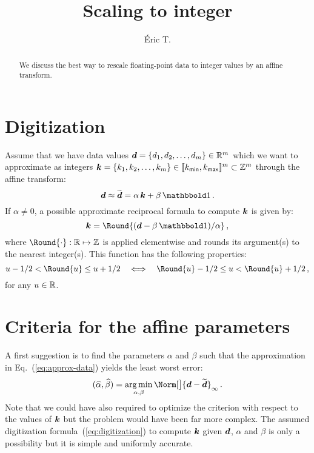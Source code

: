 \documentclass[]{article}
\title{Scaling to integer}
\author{Éric T.}
\newcommand*{\IntRange}[1]{[\![#1]\!]}
\renewcommand*{\proxy}[1]{\widetilde{#1}}
\begin{document}
\maketitle

\begin{abstract}
We discuss the best way to rescale floating-point data to integer values by an
affine transform.
\end{abstract}

\section{Digitization}

Assume that we have data values $\boldsymbol{d} = \{d_1,d_2,\ldots,d_m\} \in \mathbb{R}^m$
which we want to approximate as integers $\V k = \{k_1,k_2,\ldots,k_m\} \in
\IntRange{k_\Tag{min},k_\Tag{max}}^m\subset\Integers^m$ through the affine transform:
\begin{equation}
  \label{eq:approx-data}
  \V d \approx \proxy{\V d} = \alpha\,\V k + \beta\,\One \, .
\end{equation}
If $\alpha \not= 0$, a possible approximate reciprocal formula to compute $\boldsymbol{k}$ is given by:
\begin{equation}
  \label{eq:digitization}
  \V k = \Round{(\V d - \beta\,\One)/\alpha} \, ,
\end{equation}
where $\Round{\cdot}: \Reals\mapsto\Integers$ is applied elementwise and rounds
its argument(s) to the nearest integer(s).  This function has the following
properties:
\begin{equation}
  \label{eq:rounding}
  u - 1/2 < \Round{u} \le u + 1/2
  \quad\Longleftrightarrow \quad
  \Round{u} - 1/2 \le u < \Round{u} + 1/2 \, ,
\end{equation}
for any $u\in\mathbb{R}$.


\section{Criteria for the affine parameters}

A first suggestion is to find the parameters $\alpha$ and $\beta$ such that the
approximation in Eq.~(\ref{eq:approx-data}) yields the least worst error:
\begin{equation}
  \label{eq:criterion}
  (\estim{\alpha},\estim{\beta})
  = \argmin_{\alpha,\beta} \Norm[\big]{\V d - \proxy{\V d}}_{\infty} \, .
\end{equation}
Note that we could have also required to optimize the criterion with respect to
the values of $\boldsymbol{k}$ but the problem would have been far more complex.  The
assumed digitization formula~(\ref{eq:digitization}) to compute $\boldsymbol{k}$ given
$\boldsymbol{d}$, $\alpha$ and $\beta$ is only a possibility but it is simple and
uniformly accurate.
\end{document}
